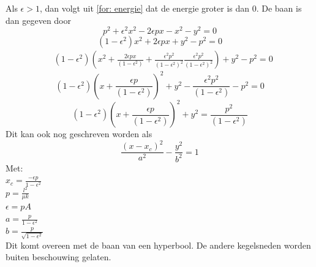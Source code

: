 Als $\epsilon > 1$, dan volgt uit \cref{for: energie} dat de energie groter is dan 0. De baan is dan gegeven door
\begingroup\makeatletter\def\f@size{7}\
\def\maketag@@@#1{\hbox{\m@th\large\normalfont#1}}%
$$p^{2}+\epsilon^{2}x^{2}-2\epsilon px-x^{2}-y^{2}=0$$
$$\left(1-\epsilon^{2}\right)x^{2}+2\epsilon px+y^{2}-p^{2}=0$$
\begin{align}
&\left(1-\epsilon^{2}\right)\left(x^{2}+\frac{2\epsilon px}{(1-\epsilon^{2})}+\frac{\epsilon^{2}p^{2}}{(1-\epsilon^{2})^{2}} \frac{\epsilon^{2}p^{2}}{(1-\epsilon^{2})^{2}}\right)
    +y^{2}-p^{2}=0    \nonumber
\end{align}
$$\left(1-\epsilon^{2}\right)\left(x+\frac{\epsilon p}{(1-\epsilon^{2})}\right)^{2}+y^{2}-\frac{\epsilon^{2}p^{2}}{(1-\epsilon^{2})}-p^{2}=0$$
$$\left(1-\epsilon^{2}\right)\left(x+\frac{\epsilon p}{(1-\epsilon^{2})}\right)^{2}+y^{2}=\frac{p^{2}}{(1-\epsilon^{2})}$$ \endgroup
Dit kan ook nog geschreven worden als
$$\frac{(x-x_{c})^{2}}{a^{2}}-\frac{y^{2}}{b^{2}}=1$$
Met: \\
$x_{c}=\frac{-\epsilon p}{1-\epsilon^{2}}$ \\
$p=\frac{l^{2}}{\mu k}$\\
$\epsilon = pA$\\
$a=\frac{p}{1-\epsilon^{2}}$\\
$b=\frac{p}{\sqrt{1-\epsilon^{2}}}$\\
Dit komt overeen met de baan van een hyperbool. De andere kegelsneden worden buiten beschouwing gelaten.
